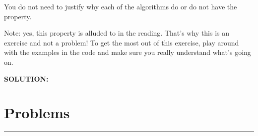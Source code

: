 \documentclass[11pt]{article}
\begin{document}
\begin{enumerate}
\begin{enumerate}
{You do not need to justify 
why each of the algorithms do or do not have the property. }

Note: yes, this property is alluded to in the reading.  That's why this is an exercise and not a problem!  To get the most out of this exercise, play around with the examples in the code and make sure you really understand what's going on.

\end{enumerate}
\ifdefined\template
\begin{shaded}
\textbf{SOLUTION:}

\ifdefined\sol

\fi
\end{shaded}
\fi


\end{enumerate}
\newpage
\section*{Problems}

\noindent
\rule{\linewidth}{0.4pt}
\end{document}
